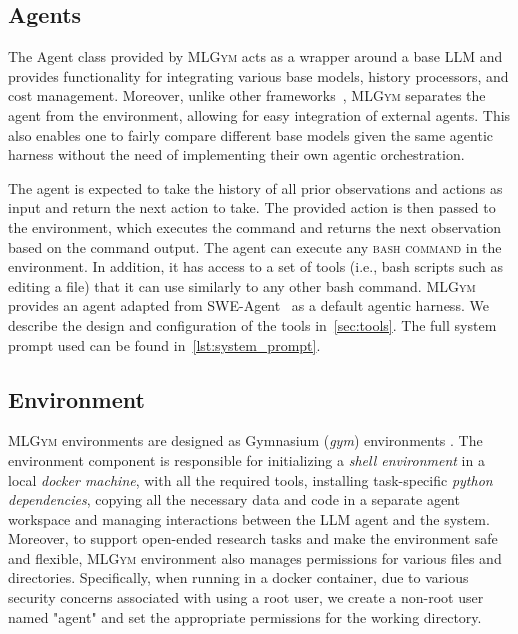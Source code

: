 \documentclass[]{fairmeta}
\newcommand{\dm}[1]{\colorbox{Emerald}{\textcolor{white}{Despoina}}\textcolor{Emerald}{\textbf{:#1}}}
\newcommand{\mlgym}{\fontfamily{lmr}\selectfont\mdseries\textsc{MLGym}\xspace}
\begin{document}
\subsection{Agents}
\label{sec:agents}
The Agent class provided by \mlgym acts as a wrapper around a base LLM and provides functionality for integrating various base models, history processors, and cost management.
%
Moreover, unlike other frameworks~\citep{huangMLAgentBenchEvaluatingLanguage2024,yangSWEagentAgentComputerInterfaces2024}, \mlgym separates the agent from the environment, allowing for easy integration of external agents.
This also enables one to fairly compare different base models given the same agentic harness without the need of implementing their own agentic orchestration.

The agent is expected to take the history of all prior observations and actions as input and return the next action to take. The provided action is then passed to the environment, which executes the command and returns the next observation based on the command output.
%
The agent can execute any \textsc{bash command} in the environment. In addition, it has access to a set of tools (i.e., bash scripts such as editing a file) that it can use similarly to any other bash command.
\mlgym provides an agent adapted from SWE-Agent~\citep{yangSWEagentAgentComputerInterfaces2024} as a default agentic harness.
We describe the design and configuration of the tools in~\autoref{sec:tools}. The full system prompt used can be found in~\autoref{lst:system_prompt}.

\subsection{Environment}
\label{sec:environment}
\mlgym environments are designed as Gymnasium (\textit{gym}) environments \citep{towers2024gymnasiumstandardinterfacereinforcement}.
%
The environment component is responsible for initializing a \textit{shell environment} in a local \textit{docker machine}, with all the required tools, installing task-specific \textit{python dependencies}, copying all the necessary data and code in a separate agent workspace and managing interactions between the LLM agent and the system.
%
Moreover, to support open-ended research tasks and make the environment safe and flexible, \mlgym environment also manages permissions for various files and directories.
%
Specifically, when running in a docker container, due to various security concerns associated with using a root user, we create a non-root user named "agent" and set the appropriate permissions for the working directory.
\end{document}
